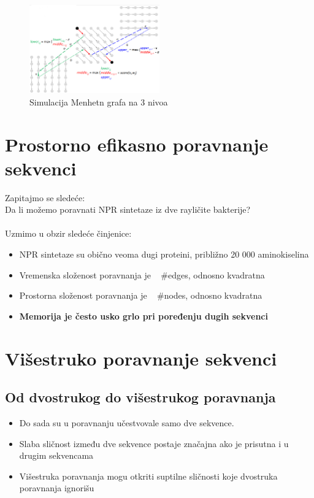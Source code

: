\begin{figure}[]
\centering
\includegraphics[width=0.5\textwidth]{poglavlja/5/slike/simulacija.png}
\caption{Simulacija Menhetn grafa na 3 nivoa}
\label{slika:simulacija}
\end{figure}


\section{Prostorno efikasno poravnanje sekvenci}

Zapitajmo se sledeće: \\
Da li možemo poravnati NPR sintetaze iz dve rayličite bakterije? \\
\\

Uzmimo u obzir sledeće činjenice:
\begin{itemize}
    \item NPR sintetaze su obično veoma dugi proteini, približno 20 000 aminokiselina
    \item Vremenska složenost poravnanja je ~ #edges, odnosno kvadratna
    \item Prostorna složenost poravnanja je ~ #nodes, odnosno kvadratna
    \item \textbf{Memorija je često usko grlo pri poređenju dugih sekvenci}
\end{itemize}


\section{Višestruko poravnanje sekvenci}

\subsection{Od dvostrukog do višestrukog poravnanja}
\begin{itemize}
    \item Do sada su u poravnanju učestvovale samo dve sekvence.
    \item Slaba sličnost između dve sekvence postaje značajna ako je prisutna i u drugim sekvencama
    \item Višestruka poravnanja mogu otkriti suptilne sličnosti koje dvostruka poravnanja ignorišu
\end{itemize}

